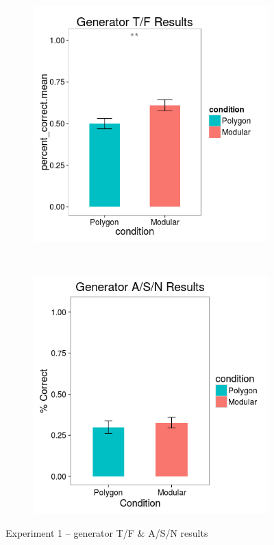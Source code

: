 \documentclass[man,10pt]{apa6}
\begin{document}
\begin{figure}[H]
\centering
\begin{subfigure}[c]{0.3\textwidth}
\centering
\includegraphics[width=\textwidth]{figures/1/gen_TF_r.png}
\end{subfigure}
~
\begin{subfigure}[c]{0.3\textwidth}
\centering
\includegraphics[width=\textwidth]{figures/1/gen_ASN_r.png}
\end{subfigure}
\caption{Experiment 1 -- generator T/F \& A/S/N results}
\label{ex1_TFASN}
\end{figure}\noindent 
\end{document}
